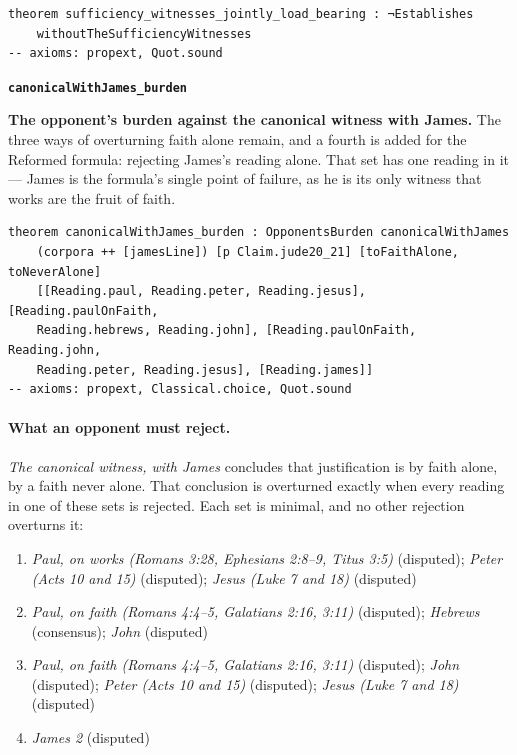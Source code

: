 \documentclass[11pt,paper=\testimonypaper,DIV=13,parskip=false]{scrartcl}
\begin{document}
{\small\begin{verbatim}
theorem sufficiency_witnesses_jointly_load_bearing : ¬Establishes
    withoutTheSufficiencyWitnesses
-- axioms: propext, Quot.sound
\end{verbatim}}
\par\medskip\noindent\textbf{\texttt{canonical\allowbreak{}With\allowbreak{}James\_\allowbreak{}burden}}\par\nobreak\noindent
\textbf{The opponent’s burden against the canonical witness with James.} The three ways of overturning faith alone remain, and a fourth is added for the Reformed formula: rejecting James’s reading alone. That set has one reading in it — James is the formula’s single point of failure, as he is its only witness that works are the fruit of faith.

{\small\begin{verbatim}
theorem canonicalWithJames_burden : OpponentsBurden canonicalWithJames
    (corpora ++ [jamesLine]) [p Claim.jude20_21] [toFaithAlone, toNeverAlone]
    [[Reading.paul, Reading.peter, Reading.jesus], [Reading.paulOnFaith,
    Reading.hebrews, Reading.john], [Reading.paulOnFaith, Reading.john,
    Reading.peter, Reading.jesus], [Reading.james]]
-- axioms: propext, Classical.choice, Quot.sound
\end{verbatim}}
\paragraph{What an opponent must reject.} \emph{The canonical witness, with James} concludes that justification is by faith alone, by a faith never alone. That conclusion is overturned exactly when every reading in one of these sets is rejected. Each set is minimal, and no other rejection overturns it:
\begin{enumerate}
\item \emph{Paul, on works (Romans 3:28, Ephesians 2:8–9, Titus 3:5)} (disputed); \emph{Peter (Acts 10 and 15)} (disputed); \emph{Jesus (Luke 7 and 18)} (disputed)
\item \emph{Paul, on faith (Romans 4:4–5, Galatians 2:16, 3:11)} (disputed); \emph{Hebrews} (consensus); \emph{John} (disputed)
\item \emph{Paul, on faith (Romans 4:4–5, Galatians 2:16, 3:11)} (disputed); \emph{John} (disputed); \emph{Peter (Acts 10 and 15)} (disputed); \emph{Jesus (Luke 7 and 18)} (disputed)
\item \emph{James 2} (disputed)
\end{enumerate}
\end{document}
